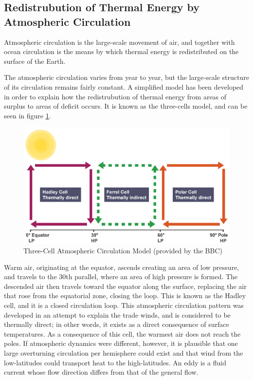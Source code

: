 \subsection{Redistrubution of Thermal Energy by Atmospheric Circulation}\label{atmospheric_circulation}
\begin{definition}
Atmospheric circulation is the large-scale movement of air, and together with ocean circulation is the means by which thermal energy is redistributed on the surface of the Earth.
\end{definition}

The atmospheric circulation varies from year to year, but the large-scale structure of its circulation remains fairly constant. A simplified model has been developed in order to explain how the redistrubution of thermal energy from areas of surplus to areas of deficit occurs. It is known as the three-cells model, and can be seen in figure \ref{three_cell}\cite{three_cell}.

\begin{figure}[H]
    \centering
    \includegraphics[width=.5\linewidth]{Images/three_cell.png}
    \caption{Three-Cell Atmospheric Circulation Model (provided by the BBC)}
    \label{three_cell}
\end{figure}

Warm air, originating at the equator, ascends creating an area of low pressure, and travels to the 30th parallel, where an area of high pressure is formed. The descended air then travels toward the equator along the surface, replacing the air that rose from the equatorial zone, closing the loop. This is known as the Hadley cell, and it is a closed circulation loop. This atmospheric circulation pattern was developed in an attempt to explain the trade winds, and is considered to be thermally direct; in other words, it exists as a direct consequence of surface temperatures\cite{cells}. As a consequence of this cell, the warmest air does not reach the poles. If atmospheric dynamics were different, however, it is plausible that one large overturning circulation per hemisphere could exist and that wind from the low-latitudes could transport heat to the high-latitudes\cite{hadley_cell}. An eddy is a fluid current whose flow direction differs from that of the general flow.

